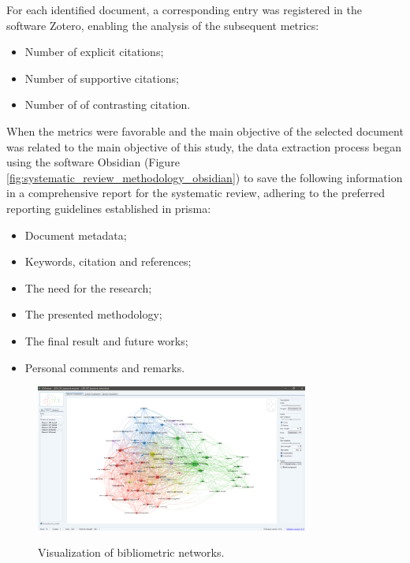 For each identified document, a corresponding entry was registered in the software Zotero, enabling the analysis of the subsequent metrics:
 \begin{itemize}
   \item Number of explicit citations;
   \item Number of supportive citations;
   \item Number of of contrasting citation.
 \end{itemize}

When the metrics were favorable and the main objective of the selected document was related to the main objective of this study, the data extraction process began using the software Obsidian (Figure \ref{fig:systematic_review_methodology_obsidian}) to save the following information in a comprehensive report for the systematic review, adhering to the preferred reporting guidelines established in \gls{prisma}:
\begin{itemize}
    \item Document metadata;
    \item Keywords, citation and references;
    \item The need for the research;
    \item The presented methodology;
    \item The final result and future works;
    \item Personal comments and remarks.
\end{itemize}

\begin{figure}[htbp]
    \raggedright
        \caption{Visualization of bibliometric networks.}
        \includegraphics[width=0.80\textwidth]{resources/images/080-systematic_review/Review_VOSviewer_03_2023_01.png}
        \label{fig:systematic_review_methodology_bibliometric_networks}
\end{figure}

